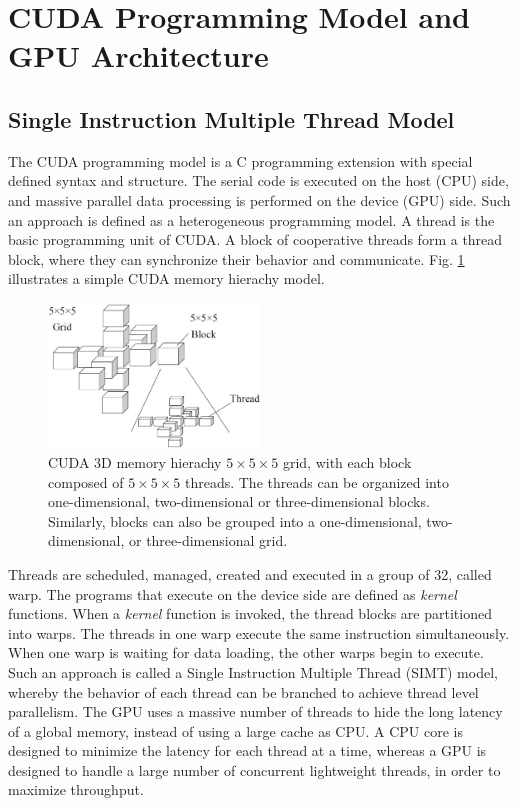 \documentclass[letterpaper, 10pt, conference,twoside]{ieeeconf}
\begin{document}
\section{CUDA Programming Model and GPU Architecture} \label{programming model} 
\subsection{Single Instruction Multiple Thread Model}
The CUDA programming model is a C programming extension with special defined syntax and structure. The serial code is executed on the host (CPU) side, and massive parallel data processing is performed on the device (GPU) side. Such an approach is defined as a heterogeneous programming model. A thread is the basic programming unit of CUDA. A block of cooperative threads form a thread block, where they can synchronize their behavior and communicate. Fig. \ref{figure1} illustrates a simple CUDA memory hierachy model.
\begin{figure}[htb]
\centering
\includegraphics*[width=0.5\textwidth]{CUDA_programming_hierachy.eps}
\caption{ CUDA 3D memory hierachy $5\times 5\times 5$ grid, with each block composed of $5\times 5\times 5$ threads.
The threads can be organized into one-dimensional, two-dimensional or three-dimensional blocks. Similarly, blocks can also be grouped into a one-dimensional, two-dimensional, or three-dimensional grid.
}
\label{figure1}
\end{figure} 

Threads are scheduled, managed, created and executed in a group of 32, called warp. The programs that execute on the device side are defined as \textit{kernel} functions. When a \textit{kernel} function is invoked, the thread blocks are partitioned into warps. The threads in one warp execute the same instruction simultaneously. When one warp is waiting for data loading, the other warps begin to execute. Such an approach is called a Single Instruction Multiple Thread (SIMT) model, whereby the behavior of each thread can be branched to achieve thread level parallelism. The GPU uses a massive number of threads to hide the long latency of a global memory, instead of using a large cache as CPU. A CPU core is designed to minimize the latency for each thread at a time, whereas a GPU is designed to handle a large number of concurrent lightweight threads, in order to maximize throughput.
\end{document}
